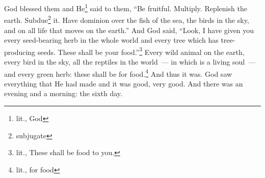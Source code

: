 \begin{enumerate*}[mode=unboxed]
     God blessed them and He\footnote{lit., God} said to them, ``Be fruitful. Multiply. Replenish the earth. Subdue\footnote{subjugate} it. Have dominion over the fish of the sea, the birds in the sky, and on all life that moves on the earth.''%
     And God said, ``Look, I have given you every seed-bearing herb in the whole world and every tree which has tree-producing seeds. These shall be your food.''\footnote{lit., These shall be food to you.}%
     Every wild animal on the earth, every bird in the sky, all the reptiles in the world~--- in which is a living soul~--- and every green herb: these shall be for food.\footnote{lit., for food} And thus it was.%
     God saw everything that He had made and it was good, very good. And there was an evening and a morning: the sixth day.%
\end{enumerate*}
